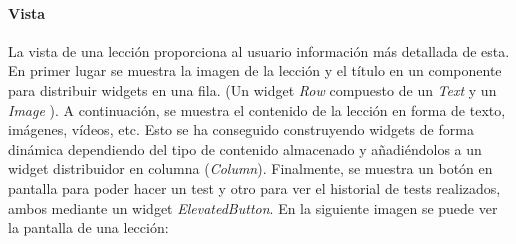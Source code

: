 \paragraph*{Vista}
La vista de una lección proporciona al usuario información más detallada de esta. En primer lugar se muestra la imagen de la lección y el título en un componente para distribuir widgets en una fila. (Un widget \textit{Row} compuesto de un \textit{Text} y un \textit{Image} ).
A continuación, se muestra el contenido de la lección en forma de texto, imágenes, vídeos, etc. Esto se ha conseguido construyendo widgets de forma dinámica dependiendo del tipo de contenido almacenado y añadiéndolos a un widget distribuidor en columna (\textit{Column}).
Finalmente, se muestra un botón en pantalla para poder hacer un test y otro para ver el historial de tests realizados, ambos mediante un widget \textit{ElevatedButton}.
En la siguiente imagen se puede ver la pantalla de una lección:


